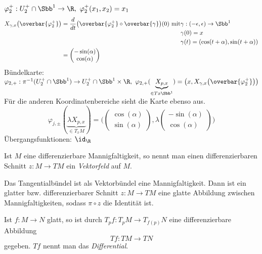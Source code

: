 \begin{rem*}
	$ \varphi_2^+ : U_2^+ \cap \Sbb^1 \to \R,\ \varphi_2^+(x_1,x_2) = x_1 $
	\begin{align*}
		X_{\gamma,x}\big( \overbar{\varphi_2^+} \big) &= \frac{d}{dt} \big( \overbar{\varphi_2^+} \circ \overbar{\gamma} \big) (0)\ \text{mit} \begin{aligned}[t]
			&\gamma: (-\epsilon,\epsilon) \to \Sbb^1\\
			&\gamma(0) = x\\
			&\gamma(t) = (\cos(t+\alpha),\sin(t+\alpha))
		\end{aligned}\\
		&= \begin{pmatrix}
			-\sin(\alpha) \\ \cos(\alpha)
		\end{pmatrix}
	\end{align*}
	Bündelkarte: $\varphi_{2,+}: \pi^{-1}(U_2^+ \cap \Sbb^1) \to U_2^+ \cap \Sbb^1 \times \R,\ \varphi_{2,+}(\underbrace{X_{p,x}}_{\in Tx\Sbb^1}) = \big( x, X_{\gamma,x}\big( \overbar{\varphi_2^+} \big) \big)$\\
	Für die anderen Koordinatenbereiche sieht die Karte ebenso aus.
	$$ \varphi_{j,\pm} (\underbrace{\lambda X_{p,x}}_{\in T_xM}) = \Bigg( \begin{pmatrix}
		\cos(\alpha)\\\sin(\alpha)
	\end{pmatrix}, \lambda \begin{pmatrix}
	-\sin(\alpha)\\\cos(\alpha)
	\end{pmatrix} \Bigg) $$
	Übergangsfunktionen: $\id_\R$
\end{rem*}

\begin{defn}[Vektorfeld] 
 	Ist $M$ eine differenzierbare Mannigfaltigkeit, so nennt man einen differenzierbaren Schnitt $z: M \to TM$ ein \emph{Vektorfeld} auf $M$.
\end{defn}

\begin{rem*}
	Das Tangentialbündel ist als Vektorbündel eine Mannigfaltigkeit. Dann ist ein glatter bzw. differenzierbarer Schnitt $z: M \to TM$ eine glatte Abbildung zwischen Mannigfaltigkeiten, sodass $\pi \circ z$ die Identität ist.
\end{rem*}

\begin{defn}[Differential]
	Ist $ f: M \to N $ glatt, so ist durch $ T_pf: T_pM \to T_{f(p)}N $ eine differenzierbare Abbildung
	\[ Tf: TM \to TN \] gegeben. $Tf$ nennt man das \emph{Differential}.
\end{defn}